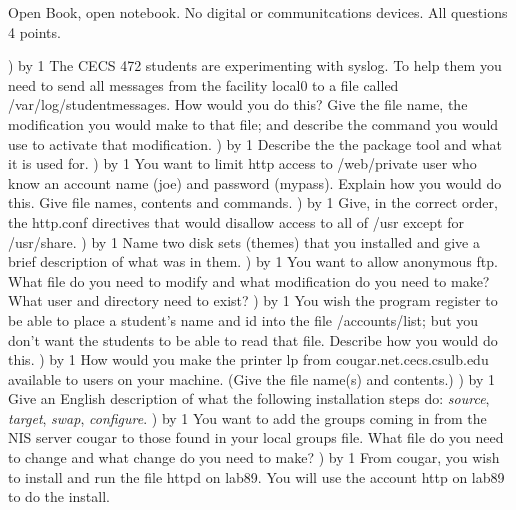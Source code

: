 
\parindent=0in
\nopagenumbers
\newcount\quesno
{}
\def\ques{\number\quesno) \advance\quesno by 1}
\def\aspace{\vskip 1.5in}

Open Book, open notebook. No digital or communitcations devices.
All questions 4 points.

\ques
The CECS 472 students are experimenting with syslog.
To help them you need to send all messages from the 
facility {\ltt{}local0} to a file called {\ltt{}/var/log/studentmessages}.
How would you do this?
Give the file name, the modification you would make to that file;
and describe the command you would use to activate that modification.
\vskip 1.2in
\ques
Describe the the package tool and what it is used for.
\vskip 1.0in
\ques
You want to limit http access to {\ltt{}/web/private} user
who know an account name ({\ltt{}joe}) and password ({\ltt{}mypass}).
Explain how you would do this. Give file names, contents and commands.
\vskip 1.7in
\ques
Give, in the correct order, the {\ltt{}http.conf} directives that would
disallow access to all of {\ltt{}/usr} except for {\ltt{}/usr/share}.
\vfill\eject
\ques
Name two disk sets (themes) that you installed and give a
brief description of what was in them.
\vskip 1.2in
\ques
You want to allow anonymous ftp.
What file do you need to modify and what modification do you need to make?
What user and directory need to exist?
\vskip 1.2in
\ques
You wish the program {\ltt{}register} to be able to
place a student's name and id into the file {\ltt{}/accounts/list};
but you don't want the students to be able to read that file.
Describe how you would do this.
\vskip 1.8in
\ques
How would you make the printer {\ltt{}lp} from
{\ltt{}cougar.net.cecs.csulb.edu} available to users on your machine.
(Give the file name(s) and contents.)
\vskip 1.2in
\ques
Give an English description of what the following installation steps do:
{\it source}, {\it target}, {\it swap}, {\it configure}.
\vskip 2.0in
\vfill\eject
\ques
You want to add the groups coming in from the NIS server {\ltt{}cougar}
to those found in your local groups file.
What file do you need to change and what change do you need to make?
\vskip 1.0in
\ques
From {\ltt{}cougar}, you wish to install and run the file {\ltt{}httpd}
on {\ltt{}lab89}.
You will use the account {\ltt{}http} on {\ltt{}lab89} to do the install.
